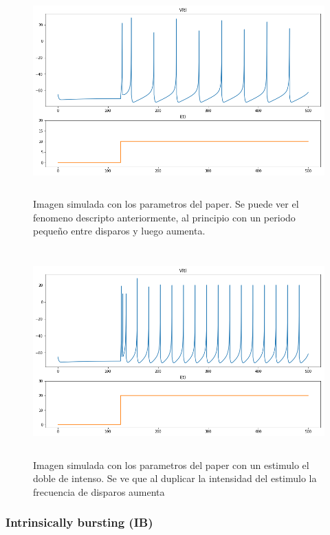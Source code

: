 \documentclass[12pt]{article}
\begin{document}
\begin{figure}[h]
    \centering
        \includegraphics[height=8cm]{images/RS_I10.png}
    \caption[fontsize=2pt]{Imagen simulada con los parametros del paper. Se puede ver el fenomeno descripto anteriormente, al principio con un periodo pequeño entre disparos y luego aumenta.}
\end{figure}

\begin{figure}[h!]
    \centering
        \includegraphics[height=8cm]{images/RS_I20.png}
    \caption[fontsize=2pt]{Imagen simulada con los parametros del paper con un estimulo el doble de intenso. Se ve que al duplicar la intensidad del estimulo la frecuencia de disparos aumenta}
\end{figure}
 \newpage

\subsubsection{Intrinsically bursting (IB)}
\end{document}
